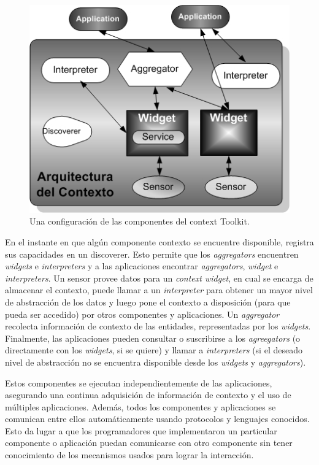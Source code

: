 \begin{figure}
\begin{center}
 \includegraphics [width=5 in,totalheight=4 in] {Ch1/f2.jpg}
\caption {Una configuración de las componentes del context Toolkit.}
\label{fig:deytoolkit}
\end{center}
\end{figure}


En el instante en que algún componente contexto se encuentre disponible,
registra sus
capacidades en un discoverer. Esto permite que los \textit{aggregators}
encuentren \textit{widgets} e
\textit{interpreters} y a las aplicaciones encontrar \textit{aggregators},
\textit{widget} e \textit{interpreters}. Un
sensor provee datos para un \textit{context widget}, en cual se encarga de
almacenar el
contexto, puede llamar a un \textit{interpreter} para obtener un mayor nivel de
abstracción de
los datos y luego pone el contexto a disposición (para que pueda ser accedido)
por otros
componentes y aplicaciones. Un \textit{aggregator} recolecta información de
contexto de las
entidades, representadas por los \textit{widgets}. Finalmente, las aplicaciones
pueden consultar
o suscribirse a los \textit{agreegators} (o directamente con los
\textit{widgets}, si se quiere) y llamar a
\textit{interpreters} (si el deseado nivel de abstracción no se encuentra
disponible desde los
\textit{widgets} y \textit{aggregators}).

Estos componentes se ejecutan independientemente de las aplicaciones, asegurando
una
continua adquisición de información de contexto y el uso de múltiples
aplicaciones.
Además, todos los componentes y aplicaciones se comunican entre ellos
automáticamente usando protocolos y lenguajes conocidos. Esto da lugar a que los
programadores que implementaron un particular componente o aplicación puedan
comunicarse con otro componente sin tener conocimiento de los mecanismos usados
para lograr la interacción.


